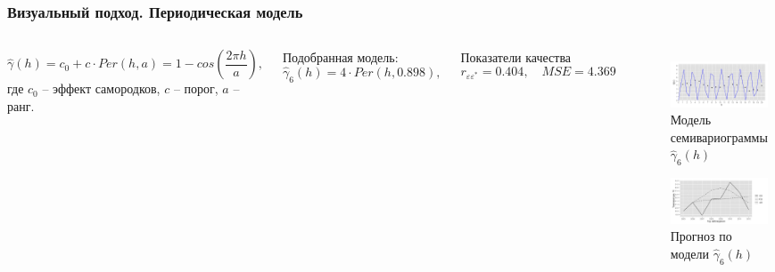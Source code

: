 \documentclass[10pt,pdf,aspectratio=169,hyperref={unicode}]{beamer}
\begin{document}
\begin{frame}
  \frametitle{Визуальный подход. \small{Периодическая модель}}
  \begin{columns}[c]
  \column{3in}
  \begin{equation}
  \label{eq:per}
    \widehat{\gamma}(h) = c_0 + c \cdot Per(h, a) = 1 - cos(\frac{2 \pi h}{a}),
  \end{equation}
  где $ c_0 $ -- эффект самородков, $ c $ -- порог, $ a $ -- ранг.

  \vspace{0.5em}

  Подобранная модель:
  \begin{equation}
  \label{eq:gamma6}
    \widehat{\gamma}_6(h) = 4 \cdot Per(h, 0.898),
  \end{equation}

  Показатели качества
  \begin{equation*}
    r_{\varepsilon\varepsilon^{*}} = 0.404, \quad MSE = 4.369
  \end{equation*}

  \column{3in}
  \vspace{-14.5pt}
  \begin{figure}[H]
    \includegraphics[width=0.9\linewidth]{../../figures/variogram/per-fit-cv-modeled.png} \\
    \caption{Модель семивариограммы $\widehat{\gamma}_6(h)$}
    \includegraphics[width=0.9\linewidth]{../../figures/variogram/per-fit-cv-cross-prediction.png}
    \caption{Прогноз по модели $\widehat{\gamma}_6(h)$}
  \end{figure}
  \end{columns}
\end{frame}
\end{document}
